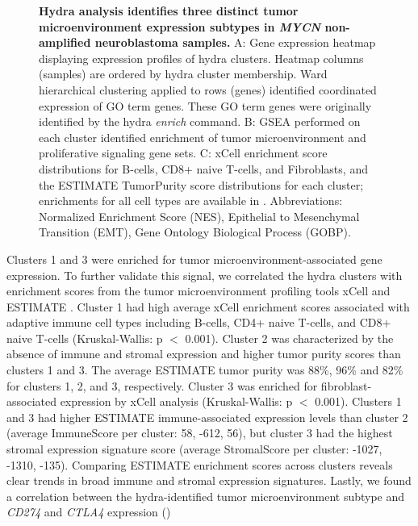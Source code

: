 \documentclass[10pt,letterpaper]{article}
\providecommand{\DIFaddtex}[1]{{\protect\color{blue}\uwave{#1}}} %
\providecommand{\DIFaddbegin}{} %
\providecommand{\DIFaddend}{} %
\providecommand{\DIFaddFL}[1]{\DIFadd{#1}} %
\providecommand{\DIFaddbeginFL}{} %
\providecommand{\DIFaddendFL}{} %
\providecommand{\DIFadd}[1]{\texorpdfstring{\DIFaddtex{#1}}{#1}} %
\newcommand{\DIFaddincludegraphics}[2][]{{\color{blue}\fbox{\DIFOincludegraphics[#1]{#2}}}} %
\DeclareRobustCommand{\DIFaddbegin}{\DIFOaddbegin \let\includegraphics\DIFaddincludegraphics} %
\DeclareRobustCommand{\DIFaddend}{\DIFOaddend \let\includegraphics\DIFOincludegraphics} %
\DeclareRobustCommand{\DIFaddbeginFL}{\DIFOaddbeginFL \let\includegraphics\DIFaddincludegraphics} %
\DeclareRobustCommand{\DIFaddendFL}{\DIFOaddendFL \let\includegraphics\DIFOincludegraphics} %
\begin{document}
\begin{figure}[!h]
	\caption{{\bf Hydra analysis identifies three distinct tumor microenvironment expression subtypes in \textit{MYCN} non-amplified neuroblastoma samples.}
	A: Gene expression heatmap displaying expression profiles of hydra clusters. Heatmap columns (samples) are ordered by hydra cluster membership. Ward hierarchical clustering applied to rows (genes) identified coordinated expression of GO term genes. These GO term genes were originally identified by the hydra \textit{enrich} command. B: GSEA performed on each cluster identified enrichment of tumor microenvironment and proliferative signaling gene sets. C: xCell enrichment score distributions for B-cells, CD8+ naive T-cells, and Fibroblasts, and the ESTIMATE TumorPurity score distributions for each cluster; enrichments for all cell types are available in . Abbreviations: Normalized Enrichment Score (NES), Epithelial to Mesenchymal Transition (EMT), \DIFaddbeginFL \DIFaddFL{Extracellular Matrix (ECM), }\DIFaddendFL Gene Ontology Biological Process (GOBP).
	\label{MYCN-NA}}
\end{figure}

Clusters 1 and 3 were enriched for tumor microenvironment-associated gene expression. To further validate this signal, we correlated the hydra clusters with enrichment scores from the tumor microenvironment profiling tools xCell \cite{aranXCellDigitallyPortraying2017} and ESTIMATE \cite{yoshiharaInferringTumourPurity2013a}. Cluster 1 had high average xCell enrichment scores associated with adaptive immune cell types including B-cells, CD4+ naive T-cells, and CD8+ naive T-cells (Kruskal-Wallis: p $<$ 0.001). Cluster 2 was characterized by the absence of immune and stromal expression and higher tumor purity scores than clusters 1 and 3. The average ESTIMATE tumor purity was 88\%, 96\% and 82\% for clusters 1, 2, and 3, respectively. Cluster 3 was enriched for fibroblast-associated expression by xCell analysis (Kruskal-Wallis: p $<$ 0.001). Clusters 1 and 3 had higher ESTIMATE immune-associated expression levels than cluster 2 (average ImmuneScore per cluster: 58, -612, 56), but cluster 3 had the highest stromal expression signature score (average StromalScore per cluster: -1027, -1310, -135). Comparing ESTIMATE enrichment scores across clusters reveals clear trends in broad immune and stromal expression signatures. Lastly, we found a correlation between the hydra-identified tumor microenvironment subtype and \textit{CD274} and \textit{CTLA4} expression ()\DIFaddbegin \DIFadd{.
}\DIFaddend 
\end{document}

